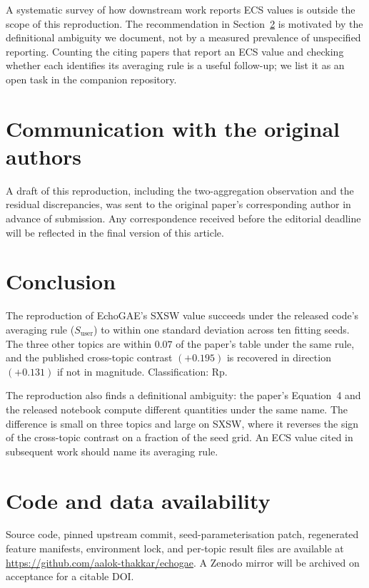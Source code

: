 A systematic survey of how downstream work reports ECS values is outside the scope of this reproduction. The recommendation in Section~\ref{sec:conclusion} is motivated by the definitional ambiguity we document, not by a measured prevalence of unspecified reporting. Counting the citing papers that report an ECS value and checking whether each identifies its averaging rule is a useful follow-up; we list it as an open task in the companion repository.

\section{Communication with the original authors}

A draft of this reproduction, including the two-aggregation observation and the residual discrepancies, was sent to the original paper's corresponding author in advance of submission. Any correspondence received before the editorial deadline will be reflected in the final version of this article.

\section{Conclusion}
\label{sec:conclusion}

The reproduction of EchoGAE's SXSW value succeeds under the released code's averaging rule ($S_{\mathrm{user}}$) to within one standard deviation across ten fitting seeds. The three other topics are within $0.07$ of the paper's table under the same rule, and the published cross-topic contrast $(+0.195)$ is recovered in direction $(+0.131)$ if not in magnitude. Classification: Rp.

The reproduction also finds a definitional ambiguity: the paper's Equation~4 and the released notebook compute different quantities under the same name. The difference is small on three topics and large on SXSW, where it reverses the sign of the cross-topic contrast on a fraction of the seed grid. An ECS value cited in subsequent work should name its averaging rule.

\section*{Code and data availability}

Source code, pinned upstream commit, seed-parameterisation patch, regenerated feature manifests, environment lock, and per-topic result files are available at \url{https://github.com/aalok-thakkar/echogae}. A Zenodo mirror will be archived on acceptance for a citable DOI.

